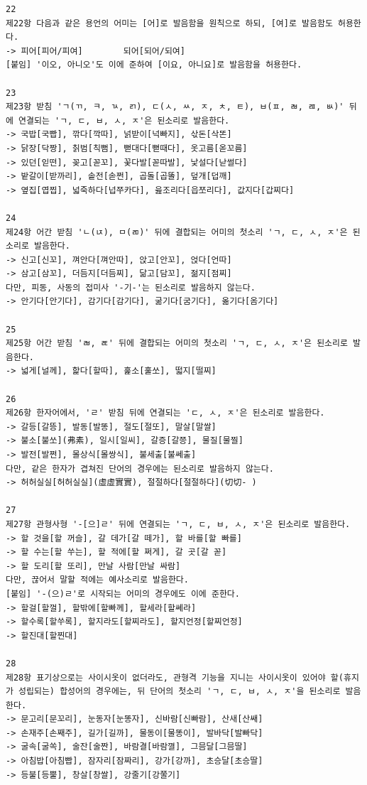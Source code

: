 \documentclass[letterpaper]{article} %
\begin{document}
\begin{verbatim}
22
제22항 다음과 같은 용언의 어미는 [어]로 발음함을 원칙으로 하되, [여]로 발음함도 허용한다.
-> 피어[피어/피여] 		되어[되어/되여]
[붙임] '이오, 아니오'도 이에 준하여 [이요, 아니요]로 발음함을 허용한다.

23
제23항 받침 'ㄱ(ㄲ, ㅋ, ㄳ, ㄺ), ㄷ(ㅅ, ㅆ, ㅈ, ㅊ, ㅌ), ㅂ(ㅍ, ㄼ, ㄿ, ㅄ)' 뒤에 연결되는 'ㄱ, ㄷ, ㅂ, ㅅ, ㅈ'은 된소리로 발음한다.
-> 국밥[국빱], 깎다[깍따], 넑받이[넉빠지], 삯돈[삭똔]
-> 닭장[닥짱], 칡범[칙뻠], 뻗대다[뻗때다], 옷고름[옫꼬름]
-> 있던[읻떤], 꽂고[꼳꼬], 꽃다발[꼳따발], 낯설다[낟썰다]
-> 밭갈이[받까리], 솥전[솓쩐], 곱돌[곱똘], 덮개[덥깨]
-> 옆집[엽찝], 넓죽하다[넙쭈카다], 읊조리다[읍쪼리다], 값지다[갑찌다]

24
제24항 어간 받침 'ㄴ(ㄵ), ㅁ(ㄻ)' 뒤에 결합되는 어미의 첫소리 'ㄱ, ㄷ, ㅅ, ㅈ'은 된소리로 발음한다.
-> 신고[신꼬], 껴안다[껴안따], 앉고[안꼬], 얹다[언따]
-> 삼고[삼꼬], 더듬지[더듬찌], 닮고[담꼬], 젊지[점찌]
다만, 피동, 사동의 접미사 '-기-'는 된소리로 발음하지 않는다.
-> 안기다[안기다], 감기다[감기다], 굶기다[굼기다], 옮기다[옴기다]

25
제25항 어간 받침 'ㄼ, ㄾ' 뒤에 결합되는 어미의 첫소리 'ㄱ, ㄷ, ㅅ, ㅈ'은 된소리로 발음한다.
-> 넓게[널께], 핥다[할따], 훑소[훌쏘], 떫지[떨찌]

26
제26항 한자어에서, 'ㄹ' 받침 뒤에 연결되는 'ㄷ, ㅅ, ㅈ'은 된소리로 발음한다.
-> 갈등[갈뜽], 발동[발똥], 절도[절또], 말살[말쌀]
-> 불소[불쏘](弗素), 일시[일씨], 갈증[갈쯩], 물질[물찔]
-> 발전[발쩐], 몰상식[몰쌍식], 불세출[불쎄출]
다만, 같은 한자가 겹쳐진 단어의 경우에는 된소리로 발음하지 않는다.
-> 허허실실[허허실실](虛虛實實), 절절하다[절절하다](切切- )

27
제27항 관형사형 '-[으]ㄹ' 뒤에 연결되는 'ㄱ, ㄷ, ㅂ, ㅅ, ㅈ'은 된소리로 발음한다.
-> 할 것을[할 꺼슬], 갈 데가[갈 떼가], 할 바를[할 빠를]
-> 할 수는[할 쑤는], 할 적에[할 쩌게], 갈 곳[갈 꼳]
-> 할 도리[할 또리], 만날 사람[만날 싸람]
다만, 끊어서 말할 적에는 예사소리로 발음한다.
[붙임] '-(으)ㄹ'로 시작되는 어미의 경우에도 이에 준한다.
-> 할걸[할껄], 할밖에[할빠께], 할세라[할쎄라]
-> 할수록[할쑤록], 할지라도[할찌라도], 할지언정[할찌언정]
-> 할진대[할찐대]

28
제28항 표기상으로는 사이시옷이 없더라도, 관형격 기능을 지니는 사이시옷이 있어야 할(휴지가 성립되는) 합성어의 경우에는, 뒤 단어의 첫소리 'ㄱ, ㄷ, ㅂ, ㅅ, ㅈ'을 된소리로 발음한다.
-> 문고리[문꼬리], 눈동자[눈똥자], 신바람[신빠람], 산새[산쌔]
-> 손재주[손째주], 길가[길까], 물동이[물똥이], 발바닥[발빠닥]
-> 굴속[굴쏙], 술잔[술짠], 바람결[바람껼], 그믐달[그믐딸]
-> 아침밥[아침빱], 잠자리[잠짜리], 강가[강까], 초승달[초승딸]
-> 등불[등뿔], 창살[창쌀], 강줄기[강쭐기]


\end{verbatim}
\end{document}
